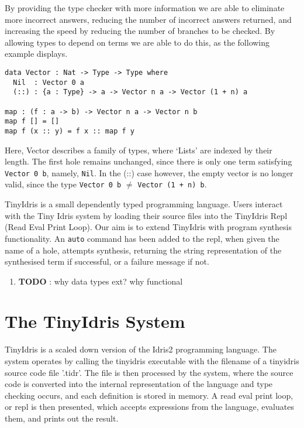 \documentclass[a4paper]{article}
\begin{document}
By providing the type checker with more information we are able to eliminate more incorrect answers, 
reducing the number of incorrect answers returned, and increasing the speed by reducing the number of branches
to be checked. By allowing types to depend on terms we are able to do this, as the following example displays.

\begin{center}
\begin{verbatim}
data Vector : Nat -> Type -> Type where
  Nil  : Vector 0 a
  (::) : {a : Type} -> a -> Vector n a -> Vector (1 + n) a

map : (f : a -> b) -> Vector n a -> Vector n b
map f [] = []
map f (x :: y) = f x :: map f y
\end{verbatim}
\end{center}

Here, Vector describes a family of types, where `Lists' are indexed by their length. 
The first hole remains unchanged, since there is only one term satisfying \texttt{Vector 0 b}, namely, \texttt{Nil}.
In the (::) case however, the empty vector is no longer valid, since the type \texttt{Vector 0 b} \(\neq\) \texttt{Vector (1 + n) b}. 

TinyIdris is a small dependently typed programming language.
Users interact with the Tiny Idris system by loading their source files into the TinyIdris Repl
(Read Eval Print Loop). Our aim is to extend TinyIdris with program synthesis functionality.
An \texttt{auto} command has been added to the repl, when given the name of a hole, attempts synthesis,
returning the string representation of the synthesised term if successful, or a failure message if not.

\begin{enumerate}
\item {\bfseries\sffamily TODO} : why data types ext? why functional
\label{sec:org0522525}

\clearpage
\end{enumerate}

\section{The TinyIdris System}
\label{sec:orgb772f45}

TinyIdris is a scaled down version of the Idris2 programming language. The system operates by calling the tinyidris
executable with the filename of a tinyidris source code file '.tidr'. The file is then processed by the system, 
where the source code is converted into the internal representation of the language and type checking occurs,
and each definition is stored in memory. A read eval print loop, or repl
is then presented, which accepts expressions from the language, evaluates them, and prints out the result. 
\end{document}
